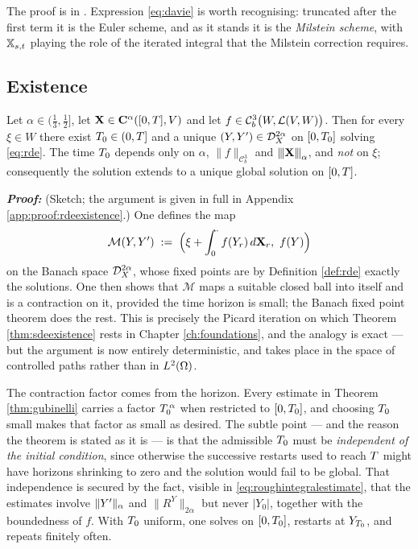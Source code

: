 The proof is in \cite[Prop.\ 8.8]{frizhairer2020}. Expression \eqref{eq:davie} is worth recognising:
truncated after the first term it is the Euler scheme, and as it stands it is the \emph{Milstein
scheme}, with $\mathbb{X}_{s,t}$ playing the role of the iterated integral that the Milstein correction
requires.

\subsection{Existence}\label{subsec:rdeexistence}

\begin{theorem}\label{thm:rdeexistence}
Let $\alpha\in(\tfrac13,\tfrac12]$, let $\mathbf{X} \in \mathbf{C}^{\alpha}([0,T],V)$ and let
$f \in \mathcal{C}^3_b\bigl(W,\mathcal{L}\!\left(V,W\right)\bigr)$. Then for every $\xi \in W$ there exist
$T_0 \in (0,T]$ and a unique $(Y,Y') \in \mathcal{D}^{2\alpha}_{X}$ on $[0,T_0]$ solving \eqref{eq:rde}.
The time $T_0$ depends only on $\alpha$, $\lVert f\rVert_{\mathcal{C}^3_b}$ and
${\left\vert\kern-0.25ex\left\vert\kern-0.25ex\left\vert \mathbf{X} \right\vert\kern-0.25ex\right\vert\kern-0.25ex\right\vert}_\alpha$, and \emph{not} on $\xi$; consequently the solution extends to a unique
global solution on $[0,T]$.
\end{theorem}

\textbf{\textit{Proof:}} (Sketch; the argument is given in full in Appendix
\ref{app:proof:rdeexistence}.) One defines the map
\begin{equation}\label{eq:picardmap}
\mathcal{M}(Y,Y') \;:=\; \Bigl( \xi + \int_0^{\cdot} f(Y_r)\,d\mathbf{X}_r,\ f(Y) \Bigr)
\end{equation}
on the Banach space $\mathcal{D}^{2\alpha}_{X}$, whose fixed points are by Definition \ref{def:rde} exactly the
solutions. One then shows that $\mathcal{M}$ maps a suitable closed ball into itself and is a
contraction on it, provided the time horizon is small; the Banach fixed point theorem does the rest.
This is precisely the Picard iteration on which Theorem \ref{thm:sdeexistence} rests in Chapter
\ref{ch:foundations}, and the analogy is exact --- but the argument is now entirely deterministic, and
takes place in the space of controlled paths rather than in $L^2(\Omega)$. \qedfilledtext

The contraction factor comes from the horizon. Every estimate in Theorem \ref{thm:gubinelli} carries
a factor $T_0^{\,\alpha}$ when restricted to $[0,T_0]$, and choosing $T_0$ small makes that
factor as small as desired. The subtle point --- and the reason the theorem is stated as it is --- is
that the admissible $T_0$ must be \emph{independent of the initial condition}, since otherwise the
successive restarts used to reach $T$ might have horizons shrinking to zero and the solution would
fail to be global. That independence is secured by the fact, visible in \eqref{eq:roughintegralestimate},
that the estimates involve $\lVert Y'\rVert_\alpha$ and $\lVert R^Y\rVert_{2\alpha}$ but never
$|Y_0|$, together with the boundedness of $f$. With $T_0$ uniform, one solves on $[0,T_0]$,
restarts at $Y_{T_0}$, and repeats finitely often.

